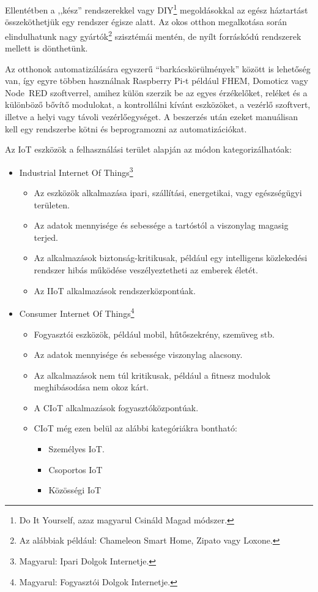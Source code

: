 \documentclass{thesis-ekf}
\theoremstyle{definition}
\begin{document}
Ellentétben a ,,kész'' rendszerekkel vagy DIY\footnote{Do It Yourself, azaz magyarul Csináld Magad módszer.} megoldásokkal az egész háztartást összeköthetjük egy rendszer égisze alatt. Az okos otthon megalkotása során elindulhatunk nagy gyártók\footnote{Az alábbiak például: Chameleon Smart Home, Zipato vagy Loxone.} szisztémái mentén, de nyílt forráskódú rendszerek mellett is dönthetünk.

Az otthonok automatizálására egyszerű “barkácskörülmények” között is lehetőség van, így egyre többen használnak Raspberry Pi-t például FHEM, Domoticz vagy Node~RED szoftverrel, amihez külön szerzik be az egyes érzékelőket, reléket és a különböző bővítő modulokat, a kontrollálni kívánt eszközöket, a vezérlő szoftvert, illetve a helyi vagy távoli vezérlőegységet. A beszerzés után ezeket manuálisan kell egy rendszerbe kötni és beprogramozni az automatizációkat. 

Az IoT eszközök a felhasználási terület alapján az módon kategorizálhatóak:
\begin{itemize}
	\item Industrial Internet Of Things\footnote{Magyarul: Ipari Dolgok Internetje.}
	\begin{itemize}
		\item Az eszközök alkalmazása ipari, szállítási, energetikai, vagy egészségügyi területen.
		\item Az adatok mennyisége és sebessége a tartóstól a viszonylag magasig terjed.
		\item Az alkalmazások biztonság-kritikusak, például egy intelligens közlekedési rendszer hibás működése veszélyeztetheti az emberek életét.
		\item Az IIoT alkalmazások rendszerközpontúak.
	\end{itemize}

	\item  Consumer Internet Of Things\footnote{Magyarul: Fogyasztói Dolgok Internetje.}  
	\begin{itemize}
		\item Fogyasztói eszközök, például mobil, hűtőszekrény, szemüveg stb.
		\item Az adatok mennyisége és sebessége viszonylag alacsony.
		\item Az alkalmazások nem túl kritikusak, például a fitnesz modulok meghibásodása nem okoz kárt.
		\item A CIoT alkalmazások fogyasztóközpontúak.
		\item CIoT még ezen belül az alábbi kategóriákra bontható:
		\begin{itemize}
			\item Személyes IoT.
			\item Csoportos IoT
			\item Közösségi IoT
		\end{itemize}
\end{itemize}
\end{itemize}
\end{document}
